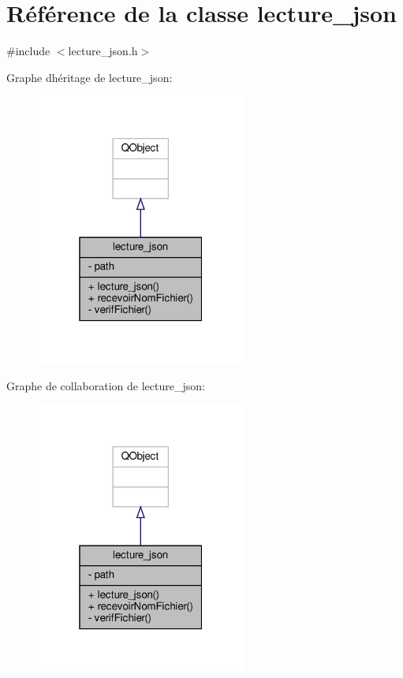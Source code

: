\hypertarget{classlecture__json}{}\section{Référence de la classe lecture\+\_\+json}
\label{classlecture__json}


{\ttfamily \#include $<$lecture\+\_\+json.\+h$>$}



Graphe d\textquotesingle{}héritage de lecture\+\_\+json\+:\nopagebreak
\begin{figure}[H]
\begin{center}
\leavevmode
\includegraphics[width=196pt]{classlecture__json__inherit__graph}
\end{center}
\end{figure}


Graphe de collaboration de lecture\+\_\+json\+:\nopagebreak
\begin{figure}[H]
\begin{center}
\leavevmode
\includegraphics[width=196pt]{classlecture__json__coll__graph}
\end{center}
\end{figure}
